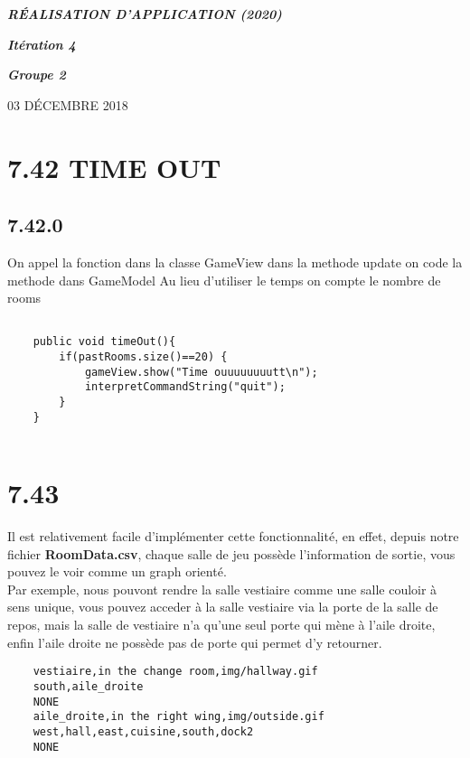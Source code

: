 \documentclass[a4paper , 10pt]{article}
\begin{document}
\begin{center}
\begin{huge}
\textit{\textbf{RÉALISATION D'APPLICATION (2020)}}
\end{huge}
\end{center}
\begin{center}
\begin{LARGE}
\textit{\textbf{Itération 4}}
\end{LARGE}
\end{center}
\textit{}
\textit{}
\begin{center}
\begin{flushleft}
\begin{Large}
\textbf{\textit{Groupe 2}}
\end{Large}
\end{flushleft}
\end{center}
\begin{center}
03 D\'ECEMBRE 2018
\end{center}

\section{7.42 TIME OUT}
\subsection{7.42.0}
On appel la fonction dans la classe GameView  dans la methode update
on code la methode dans GameModel
Au lieu d'utiliser le temps on compte le nombre de rooms
\begin{verbatim}

    public void timeOut(){
        if(pastRooms.size()==20) {
            gameView.show("Time ouuuuuuuutt\n");
            interpretCommandString("quit");
        }
    }
    
\end{verbatim}
\section{7.43}
Il est relativement facile d'implémenter cette fonctionnalité, en effet, depuis notre fichier \textbf{RoomData.csv}, chaque 
salle de jeu possède l'information de sortie, vous pouvez le voir comme un graph orienté.\\
Par exemple, nous pouvont rendre la salle vestiaire comme une salle couloir à sens unique, vous pouvez acceder 
à la salle vestiaire via la porte de la salle de repos, mais la salle de vestiaire n'a qu'une seul porte qui mène à l'aile droite,
enfin l'aile droite ne possède pas de porte qui permet d'y retourner.  
\begin{verbatim}
    vestiaire,in the change room,img/hallway.gif
    south,aile_droite
    NONE
    aile_droite,in the right wing,img/outside.gif
    west,hall,east,cuisine,south,dock2
    NONE
\end{verbatim}
\end{document}
